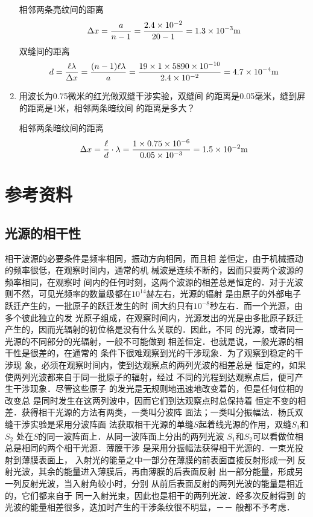 \begin{enumerate}
    \begin{solution}
相邻两条亮纹间的距离
\[\Delta x=\frac{a}{n-1}=\frac{2.4\times 10^{-2}}{20-1}=1.3\times 10^{-3}{\rm m}\]
双缝间的距离
\[d=\frac{\ell \lambda}{\Delta x}=\frac{(n-1)\ell\lambda}{a}=\frac{19\times 1\times 5890\times 10^{-10}}{2.4\times 10^{-2}}=4.7\times 10^{-4}{\rm m}\]
    \end{solution}
    
    \item 用波长为0.75微米的红光做双缝干涉实验，双缝间
    的距离是0.05毫米，缝到屏的距离是1米，相邻两条暗纹间
    的距离是多大？


    \begin{solution}
相邻两条暗纹间的距离
\[\Delta x=\frac{\ell }{d}\cdot\lambda=\frac{1\times 0.75\times 10^{-6}}{0.05\times 10^{-3}}=1.5\times 10^{-2}{\rm m}\]
    \end{solution}
    
\end{enumerate}

\section{参考资料}
\subsection{光源的相干性}
相干波源的必要条件是频率相同，振动方向相同，而且相
差恒定，由于机械振动的频率很低，在观察时间内，通常的机
械波是连续不断的，因而只要两个波源的频率相同，在观察时
间内的任何时刻，这两个波源的相差总是恒定的．对于光波
则不然，可见光频率的数量级都在$10^{14}$赫左右，光源的辐射
是由原子的外部电子跃迁产生的，一批原子的跃迁发生的时
间大约只有$10^{-8}$秒左右．而一个光源，由多个彼此独立的发
光原子组成，在观察时间内，光源发出的光是由多批原子跃迁
产生的，因而光辐射的初位格是没有什么关联的．因此，不同
的光源，或者同一光源的不同部分的光辐射，一般不可能做到
相差恒定．也就是说，一般光源的相干性是很差的，在通常的
条件下很难观察到光的干涉现象．为了观察到稳定的干涉现
象，必须在观察时间内，使到达观察点的两列光波的相差总是
恒定的，如果使两列光波都来自于同一批原子的辐射，经过
不同的光程到达观察点后，便可产生干涉现象．尽管这些原子
的发光是无规则地迅速地改变着的，但是任何位相的改变总
是同时发生在这两列波中，因而它们到达观察点时总保持着
恒定不变的相差．获得相干光源的方法有两类，一类叫分波阵
面法；一类叫分振幅法．杨氏双缝干涉实验是采用分波阵面
法获取相干光源的单缝$S$起着线光源的作用，双缝$S_1$和$S_2$
处在$S$的同一波阵面上．从同一波阵面上分出的两列光波
$S_1$和$S_2$可以看做位相总是相同的两个相干光源．薄膜干涉
是采用分振幅法获得相干光源的．一束光投射到薄膜表面上，
入射光的能量之中一部分在薄膜的前表面直接反射形成一列
反射光波，其余的能量进入薄膜后，再由薄膜的后表面反射
出一部分能量，形成另一列反射光波，当入射角较小时，分别
从前后表面反射的两列光波的能量是相近的，它们都来自于
同一入射光束，因此也是相干的两列光波．经多次反射得到
的光波的能量相差很多，迭加时产生的干涉条纹很不明显，－－
般都不予考虑．

